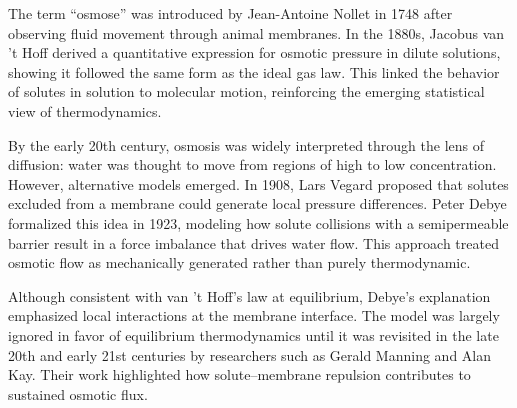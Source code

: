 \begin{historical}
The term “osmose” was introduced by Jean-Antoine Nollet in 1748 after observing fluid movement through animal membranes. In the 1880s, Jacobus van ’t Hoff derived a quantitative expression for osmotic pressure in dilute solutions, showing it followed the same form as the ideal gas law. This linked the behavior of solutes in solution to molecular motion, reinforcing the emerging statistical view of thermodynamics.

By the early 20th century, osmosis was widely interpreted through the lens of diffusion: water was thought to move from regions of high to low concentration. However, alternative models emerged. In 1908, Lars Vegard proposed that solutes excluded from a membrane could generate local pressure differences. Peter Debye formalized this idea in 1923, modeling how solute collisions with a semipermeable barrier result in a force imbalance that drives water flow. This approach treated osmotic flow as mechanically generated rather than purely thermodynamic.

Although consistent with van ’t Hoff’s law at equilibrium, Debye’s explanation emphasized local interactions at the membrane interface. The model was largely ignored in favor of equilibrium thermodynamics until it was revisited in the late 20th and early 21st centuries by researchers such as Gerald Manning and Alan Kay. Their work highlighted how solute–membrane repulsion contributes to sustained osmotic flux.
\end{historical}
